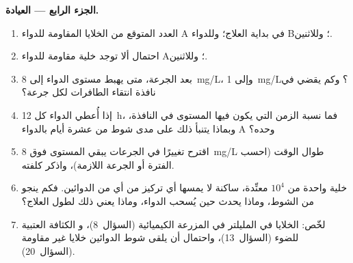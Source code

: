 \begin{problem}
\medskip
\noindent\textbf{الجزء الرابع --- العيادة.}
\begin{enumerate}[resume]
  \item العدد المتوقع من الخلايا المقاومة للدواء A في بداية
        العلاج؛ وللدواء B؛ وللاثنين.
  \item احتمال ألا توجد خلية مقاومة للدواء A؛ وللاثنين.
  \item بعد الجرعة، متى يهبط مستوى الدواء إلى \qty{8}{mg/L}،
        وإلى \qty{1}{mg/L}؟ وكم يقضي في نافذة انتقاء
        الطافرات لكل جرعة؟
  \item إذا أُعطي الدواء كل \qty{12}{h}، فما نسبة
        الزمن التي يكون فيها المستوى في النافذة، وبماذا يتنبأ ذلك
        على مدى شوط من عشرة أيام بالدواء A وحده؟
  \item اقترح تغييرًا في الجرعات يبقي المستوى فوق
        \qty{8}{mg/L} طوال الوقت (احسب الفترة أو الجرعة
        اللازمة)، واذكر كلفته.
  \item خلية واحدة من $10^{4}$ معنِّدة، ساكنة لا يمسها
        أي تركيز من أي من الدوائين. فكم ينجو من الشوط،
        وماذا يحدث حين يُسحب الدواء، وماذا يعني ذلك
        لطول العلاج؟
  \item لخّص: الخلايا في المليلتر في المزرعة الكيميائية (السؤال~8)، و
        الكثافة العتبية للضوء (السؤال~13)، واحتمال أن
        يلقى شوط الدوائين خلايا غير مقاومة (السؤال~20).
\end{enumerate}
\end{problem}
